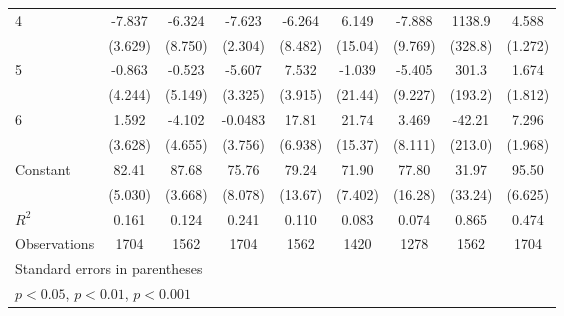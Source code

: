\documentclass{article}
\begin{document}
{\begin{longtable}{l*{8}{c}}
4               &   -7.837         &   -6.324         &   -7.623\sym{**} &   -6.264         &    6.149         &   -7.888         &   1138.9\sym{**} &    4.588\sym{**} \\
                &  (3.629)         &  (8.750)         &  (2.304)         &  (8.482)         &  (15.04)         &  (9.769)         &  (328.8)         &  (1.272)         \\
5               &   -0.863         &   -0.523         &   -5.607         &    7.532         &   -1.039         &   -5.405         &    301.3         &    1.674         \\
                &  (4.244)         &  (5.149)         &  (3.325)         &  (3.915)         &  (21.44)         &  (9.227)         &  (193.2)         &  (1.812)         \\
6               &    1.592         &   -4.102         &  -0.0483         &    17.81\sym{*}  &    21.74         &    3.469         &   -42.21         &    7.296\sym{**} \\
                &  (3.628)         &  (4.655)         &  (3.756)         &  (6.938)         &  (15.37)         &  (8.111)         &  (213.0)         &  (1.968)         \\
Constant        &    82.41\sym{***}&    87.68\sym{***}&    75.76\sym{***}&    79.24\sym{***}&    71.90\sym{***}&    77.80\sym{**} &    31.97         &    95.50\sym{***}\\
                &  (5.030)         &  (3.668)         &  (8.078)         &  (13.67)         &  (7.402)         &  (16.28)         &  (33.24)         &  (6.625)         \\
\hline
\(R^{2}\)       &    0.161         &    0.124         &    0.241         &    0.110         &    0.083         &    0.074         &    0.865         &    0.474         \\
Observations    &     1704         &     1562         &     1704         &     1562         &     1420         &     1278         &     1562         &     1704         \\
\hline\hline
\multicolumn{9}{l}{\footnotesize Standard errors in parentheses}\\
\multicolumn{9}{l}{\footnotesize \sym{*} \(p<0.05\), \sym{**} \(p<0.01\), \sym{***} \(p<0.001\)}\\
\end{longtable}
}
\end{document}
